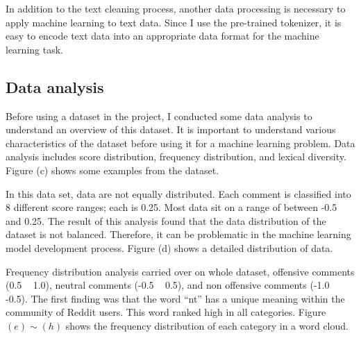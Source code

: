 \documentclass[11pt, natbib=false]{article}
\begin{document}
In addition to the text cleaning process, another data processing is necessary to apply machine learning to text data.
Since I use the pre-trained tokenizer, it is easy to encode text data into an appropriate data format for the machine learning task.


\subsection{Data analysis}
Before using a dataset in the project, I conducted some data analysis to understand an overview of this dataset.
It is important to understand various characteristics of the dataset before using it for a machine learning problem.
Data analysis includes score distribution, frequency distribution, and lexical diversity.
Figure (c) shows some examples from the dataset.

In this data set, data are not equally distributed.
Each comment is classified into 8 different score ranges; each is 0.25.
Most data sit on a range of between -0.5 and 0.25.
The result of this analysis found that the data distribution of the dataset is not balanced.
Therefore, it can be problematic in the machine learning model development process.
Figure (d) shows a detailed distribution of data.

Frequency distribution analysis carried over on whole dataset, offensive comments (0.5 ~ 1.0), neutral comments (-0.5 ~ 0.5), and non offensive comments (-1.0 ~ -0.5).
The first finding was that the word “nt” has a unique meaning within the community of Reddit users.
This word ranked high in all categories.
Figure $ (e) \sim (h)$ shows the frequency distribution of each category in a word cloud.
\end{document}
